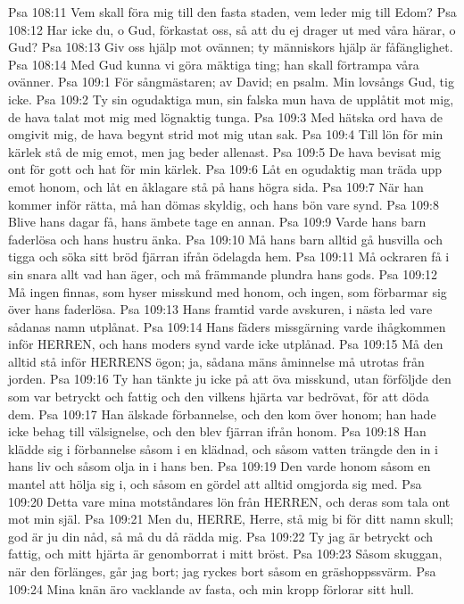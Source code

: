 Psa 108:11  Vem skall föra mig till den fasta staden, vem leder mig till Edom?
Psa 108:12  Har icke du, o Gud, förkastat oss, så att du ej drager ut med våra härar, o Gud?
Psa 108:13  Giv oss hjälp mot ovännen; ty människors hjälp är fåfänglighet.
Psa 108:14  Med Gud kunna vi göra mäktiga ting; han skall förtrampa våra ovänner.
Psa 109:1  För sångmästaren; av David; en psalm. Min lovsångs Gud, tig icke.
Psa 109:2  Ty sin ogudaktiga mun, sin falska mun hava de upplåtit mot mig, de hava talat mot mig med lögnaktig tunga.
Psa 109:3  Med hätska ord hava de omgivit mig, de hava begynt strid mot mig utan sak.
Psa 109:4  Till lön för min kärlek stå de mig emot, men jag beder allenast.
Psa 109:5  De hava bevisat mig ont för gott och hat för min kärlek.
Psa 109:6  Låt en ogudaktig man träda upp emot honom, och låt en åklagare stå på hans högra sida.
Psa 109:7  När han kommer inför rätta, må han dömas skyldig, och hans bön vare synd.
Psa 109:8  Blive hans dagar få, hans ämbete tage en annan.
Psa 109:9  Varde hans barn faderlösa och hans hustru änka.
Psa 109:10  Må hans barn alltid gå husvilla och tigga och söka sitt bröd fjärran ifrån ödelagda hem.
Psa 109:11  Må ockraren få i sin snara allt vad han äger, och må främmande plundra hans gods.
Psa 109:12  Må ingen finnas, som hyser misskund med honom, och ingen, som förbarmar sig över hans faderlösa.
Psa 109:13  Hans framtid varde avskuren, i nästa led vare sådanas namn utplånat.
Psa 109:14  Hans fäders missgärning varde ihågkommen inför HERREN, och hans moders synd varde icke utplånad.
Psa 109:15  Må den alltid stå inför HERRENS ögon; ja, sådana mäns åminnelse må utrotas från jorden.
Psa 109:16  Ty han tänkte ju icke på att öva misskund, utan förföljde den som var betryckt och fattig och den vilkens hjärta var bedrövat, för att döda dem.
Psa 109:17  Han älskade förbannelse, och den kom över honom; han hade icke behag till välsignelse, och den blev fjärran ifrån honom.
Psa 109:18  Han klädde sig i förbannelse såsom i en klädnad, och såsom vatten trängde den in i hans liv och såsom olja in i hans ben.
Psa 109:19  Den varde honom såsom en mantel att hölja sig i, och såsom en gördel att alltid omgjorda sig med.
Psa 109:20  Detta vare mina motståndares lön från HERREN, och deras som tala ont mot min själ.
Psa 109:21  Men du, HERRE, Herre, stå mig bi för ditt namn skull; god är ju din nåd, så må du då rädda mig.
Psa 109:22  Ty jag är betryckt och fattig, och mitt hjärta är genomborrat i mitt bröst.
Psa 109:23  Såsom skuggan, när den förlänges, går jag bort; jag ryckes bort såsom en gräshoppssvärm.
Psa 109:24  Mina knän äro vacklande av fasta, och min kropp förlorar sitt hull.
